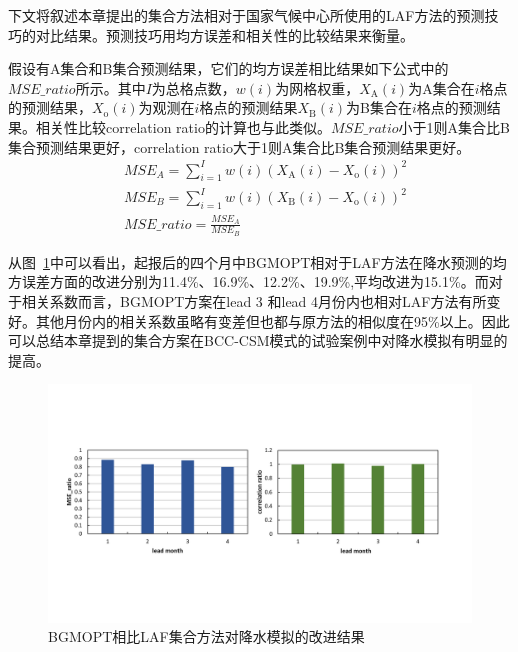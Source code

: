 下文将叙述本章提出的集合方法相对于国家气候中心所使用的LAF方法的预测技巧的对比结果。预测技巧用均方误差和相关性的比较结果来衡量。

假设有A集合和B集合预测结果，它们的均方误差相比结果如下公式中的$MSE\_ratio$所示。其中$I$为总格点数，$w ( i ) $为网格权重，$X _ { \mathrm { A } } ( i )$为A集合在$i$格点的预测结果，$X _ { \mathrm { o} } ( i )$为观测在$i$格点的预测结果$X _ { \mathrm { B } } ( i )$为B集合在$i$格点的预测结果。相关性比较correlation ratio的计算也与此类似。$MSE\_ratio$小于1则A集合比B集合预测结果更好，correlation ratio大于1则A集合比B集合预测结果更好。
\begin{align}
& MSE_A = \sum _ { i = 1 } ^ { I } w ( i ) \left( X _ { \mathrm { A } } ( i ) - X _ { \mathrm { o } }  ( i ) \right) ^ { 2 }  \\
& MSE_B = \sum _ { i = 1 } ^ { I } w ( i ) \left( X _ { \mathrm { B } } ( i ) - X _ { \mathrm { o } }  ( i ) \right) ^ { 2 }  \\
& MSE\_ratio = \frac {MSE_A}{MSE_B} \label{eq:MSE}
\end{align}

从图~\ref{fig:prect bgmopt}中可以看出，起报后的四个月中BGMOPT相对于LAF方法在降水预测的均方误差方面的改进分别为11.4\%、16.9\%、12.2\%、19.9\%,平均改进为15.1\%。而对于相关系数而言，BGMOPT方案在lead 3 和lead 4月份内也相对LAF方法有所变好。其他月份内的相关系数虽略有变差但也都与原方法的相似度在95\%以上。因此可以总结本章提到的集合方案在BCC-CSM模式的试验案例中对降水模拟有明显的提高。

\begin{figure}[H] %
\label{prectresult}
  \centering
  \includegraphics[scale=0.50,trim=0 125 0 125,clip]{figures/BGMOPTPRECT1.pdf}
  \caption{BGMOPT相比LAF集合方法对降水模拟的改进结果}
  \label{fig:prect bgmopt}
\end{figure}

